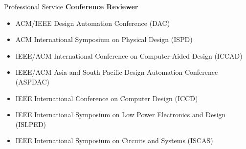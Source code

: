 \begin{rSection}{Professional Service}
\textbf{Conference Reviewer}
\begin{itemize}
    \item ACM/IEEE Design Automation Conference (DAC)
    \item ACM International Symposium on Physical Design (ISPD)
    \item IEEE/ACM International Conference on Computer-Aided Design (ICCAD)
    \item IEEE/ACM Asia and South Pacific Design Automation Conference (ASPDAC)
    \item IEEE International Conference on Computer Design (ICCD)
    \item IEEE International Symposium on Low Power Electronics and Design (ISLPED)
    \item IEEE International Symposium on Circuits and Systems (ISCAS)
\end{itemize}
\end{rSection}


